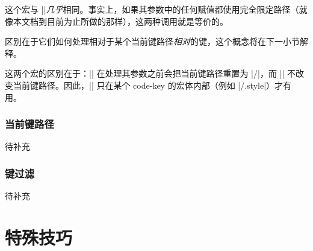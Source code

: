 \documentclass[a4paper,doc2]{ltxdoc}
\begin{document}
\begin{command}{\pgfkeysalso{}}
	这个宏与 |\pgfkeys|\emph{几乎}相同。事实上，如果其参数中的任何赋值都使用完全限定路径（就像本文档到目前为止所做的那样），这两种调用就是等价的。

	区别在于它们如何处理相对于某个当前键路径\emph{相对}的键，这个概念将在下一小节解释。

	这两个宏的区别在于：|\pgfkeys| 在处理其参数之前会把当前键路径重置为 |/|，而 |\pgfkeysalso| 不改变当前键路径。因此，|\pgfkeysalso| 只在某个 code-key 的宏体内部（例如 |/.style|）才有用。
\end{command}

\subsubsection{当前键路径}
待补充

\subsubsection{键过滤}
待补充

\endgroup







\section{特殊技巧}
\end{document}
